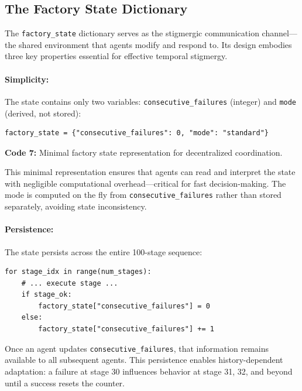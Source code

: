 \documentclass[12pt,a4paper,oneside]{report}
\begin{document}
\subsection{The Factory State Dictionary}
\label{subsec:the_factory_state_dictionary}

The \texttt{factory\_state} dictionary serves as the stigmergic communication channel—the shared environment that agents modify and respond to. Its design embodies three key properties essential for effective temporal stigmergy.

\paragraph{Simplicity:} The state contains only two variables: \texttt{consecutive\_failures} (integer) and \texttt{mode} (derived, not stored):

\begin{verbatim}
factory_state = {"consecutive_failures": 0, "mode": "standard"}
\end{verbatim}
\vspace{0.2cm}
{\small \textbf{Code 7:} Minimal factory state representation for decentralized coordination.\label{code:minimal_state}}
\vspace{0.3cm}

This minimal representation ensures that agents can read and interpret the state with negligible computational overhead—critical for fast decision-making. The mode is computed on the fly from \texttt{consecutive\_failures} rather than stored separately, avoiding state inconsistency.

\paragraph{Persistence:} The state persists across the entire 100-stage sequence:

\begin{verbatim}
for stage_idx in range(num_stages):
    # ... execute stage ...
    if stage_ok:
        factory_state["consecutive_failures"] = 0
    else:
        factory_state["consecutive_failures"] += 1
\end{verbatim}

Once an agent updates \texttt{consecutive\_failures}, that information remains available to all subsequent agents. This persistence enables history-dependent adaptation: a failure at stage 30 influences behavior at stage 31, 32, and beyond until a success resets the counter.
\end{document}
